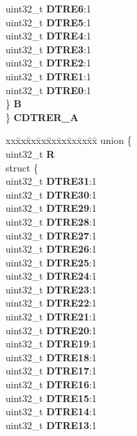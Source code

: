 \begin{DoxyCompactItemize}
\begin{tabbing}
\>\>uint32\_t {\bfseries DTRE6}:1\\
\>\>uint32\_t {\bfseries DTRE5}:1\\
\>\>uint32\_t {\bfseries DTRE4}:1\\
\>\>uint32\_t {\bfseries DTRE3}:1\\
\>\>uint32\_t {\bfseries DTRE2}:1\\
\>\>uint32\_t {\bfseries DTRE1}:1\\
\>\>uint32\_t {\bfseries DTRE0}:1\\
\>\} {\bfseries B}\\
\} {\bfseries CDTRER\_A}\\

\end{tabbing}\item 
\mbox{\label{structETPU__tag_ac4134f7effb7755bfb850b0f828098c7}} 
\begin{tabbing}
xx\=xx\=xx\=xx\=xx\=xx\=xx\=xx\=xx\=\kill
union \{\\
\>uint32\_t {\bfseries R}\\
\>struct \{\\
\>\>uint32\_t {\bfseries DTRE31}:1\\
\>\>uint32\_t {\bfseries DTRE30}:1\\
\>\>uint32\_t {\bfseries DTRE29}:1\\
\>\>uint32\_t {\bfseries DTRE28}:1\\
\>\>uint32\_t {\bfseries DTRE27}:1\\
\>\>uint32\_t {\bfseries DTRE26}:1\\
\>\>uint32\_t {\bfseries DTRE25}:1\\
\>\>uint32\_t {\bfseries DTRE24}:1\\
\>\>uint32\_t {\bfseries DTRE23}:1\\
\>\>uint32\_t {\bfseries DTRE22}:1\\
\>\>uint32\_t {\bfseries DTRE21}:1\\
\>\>uint32\_t {\bfseries DTRE20}:1\\
\>\>uint32\_t {\bfseries DTRE19}:1\\
\>\>uint32\_t {\bfseries DTRE18}:1\\
\>\>uint32\_t {\bfseries DTRE17}:1\\
\>\>uint32\_t {\bfseries DTRE16}:1\\
\>\>uint32\_t {\bfseries DTRE15}:1\\
\>\>uint32\_t {\bfseries DTRE14}:1\\
\>\>uint32\_t {\bfseries DTRE13}:1\\

\end{tabbing}
\end{DoxyCompactItemize}
